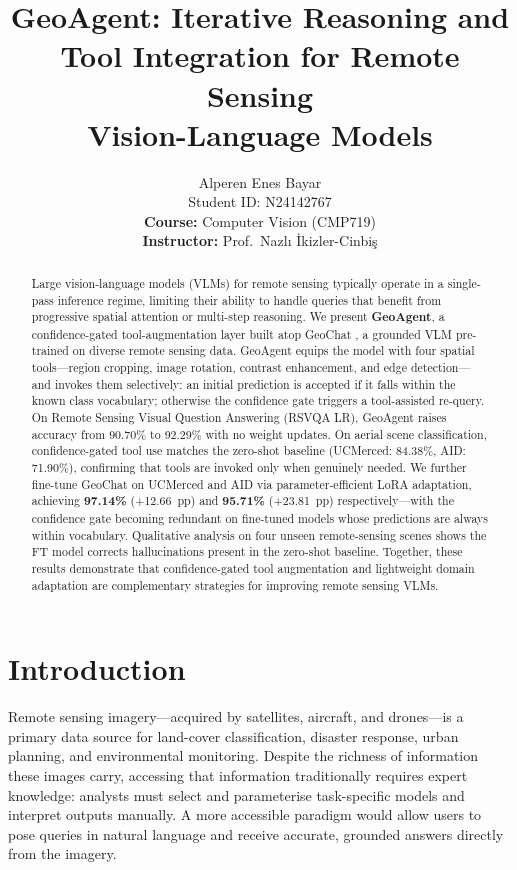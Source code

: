 \documentclass{article}
\title{GeoAgent: Iterative Reasoning and \\ Tool Integration for Remote Sensing \\ Vision-Language Models}
\author{%
  Alperen Enes Bayar \\
  Student ID: N24142767 \\[0.5ex]
  \textbf{Course:} Computer Vision (CMP719) \\
  \textbf{Instructor:} Prof.\ Naz\-l{\i} \. Ikizler-Cinbi\c{s}
}
\begin{document}
\maketitle

\begin{abstract}
Large vision-language models (VLMs) for remote sensing typically operate in a
single-pass inference regime, limiting their ability to handle queries that
benefit from progressive spatial attention or multi-step reasoning.  We present
\textbf{GeoAgent}, a confidence-gated tool-augmentation layer built atop
GeoChat \citep{kuckreja2024geochat}, a grounded VLM pre-trained on diverse
remote sensing data.  GeoAgent equips the model with four spatial tools---region
cropping, image rotation, contrast enhancement, and edge detection---and invokes
them selectively: an initial prediction is accepted if it falls within the known
class vocabulary; otherwise the confidence gate triggers a tool-assisted
re-query.  On Remote Sensing Visual Question Answering (RSVQA LR), GeoAgent
raises accuracy from 90.70\% to 92.29\% with no weight updates.  On aerial
scene classification, confidence-gated tool use matches the zero-shot baseline
(UCMerced: 84.38\%, AID: 71.90\%), confirming that tools are invoked only when
genuinely needed.  We further fine-tune GeoChat on UCMerced and AID via
parameter-efficient LoRA adaptation, achieving \textbf{97.14\%} (+12.66~pp) and
\textbf{95.71\%} (+23.81~pp) respectively---with the confidence gate becoming
redundant on fine-tuned models whose predictions are always within vocabulary.
Qualitative analysis on four unseen remote-sensing scenes shows the FT model
corrects hallucinations present in the zero-shot baseline.  Together, these
results demonstrate that confidence-gated tool augmentation and lightweight
domain adaptation are complementary strategies for improving remote sensing VLMs.
\end{abstract}

\section{Introduction}
\label{sec:intro}

Remote sensing imagery---acquired by satellites, aircraft, and drones---is a
primary data source for land-cover classification, disaster response, urban
planning, and environmental monitoring.  Despite the richness of information these
images carry, accessing that information traditionally requires expert knowledge:
analysts must select and parameterise task-specific models and interpret outputs
manually.  A more accessible paradigm would allow users to pose queries in natural
language and receive accurate, grounded answers directly from the imagery.
\end{document}
